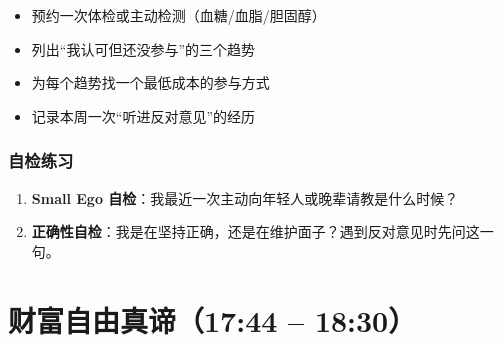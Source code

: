 \begin{itemize}
\tightlist
\item[$\square$]
  预约一次体检或主动检测（血糖/血脂/胆固醇）
\item[$\square$]
  列出``我认可但还没参与''的三个趋势
\item[$\square$]
  为每个趋势找一个最低成本的参与方式
\item[$\square$]
  记录本周一次``听进反对意见''的经历
\end{itemize}

\subsubsection{自检练习}

\begin{enumerate}
\def\labelenumi{\arabic{enumi}.}
\tightlist
\item
  \textbf{Small Ego 自检}：我最近一次主动向年轻人或晚辈请教是什么时候？
\item
  \textbf{正确性自检}：我是在坚持正确，还是在维护面子？遇到反对意见时先问这一句。
\end{enumerate}

\section{财富自由真谛（17:44 --
18:30）}

